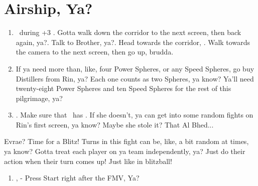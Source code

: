 \chapter{Airship, Ya?}

\begin{enumerate}
\item \sd\ during \cs+3 \skippablefmv. Gotta walk down the corridor to the next screen, then back again, ya?\sd. Talk to Brother, ya?\sd. Head towards the corridor, \sd. Walk towards the camera to the next screen, then go up, brudda.
\item If ya need more than, like, four Power Spheres, or any Speed Spheres, go buy Distillers from Rin, ya? Each one counts as two Spheres, ya know? Ya'll need twenty-eight Power Spheres and ten Speed Spheres for the rest of this pilgrimage, ya?
\item \save. Make sure that \rikku\ has \od. If she doesn't, ya can get into some random fights on Rin's first screen, ya know? Maybe she stole it? That Al Bhed...
\end{enumerate}
\begin{battle}[32000]{Evrae? Time for a Blitz!}
Turns in this fight can be, like, a bit random at times, ya know? Gotta treat each player on ya team independently, ya? Just do their action when their turn comes up! Just like in blitzball!
\begin{itemize}
\end{itemize}
\end{battle}
\begin{enumerate}[resume]
\item \sd, \skippablefmv[3:00] - Press Start right after the FMV, Ya?
\end{enumerate}
\wincb